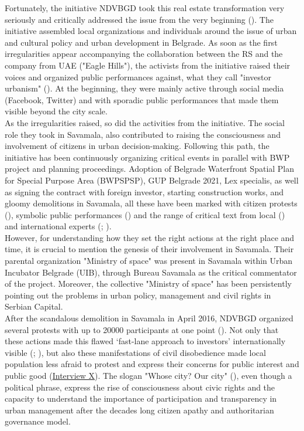 \documentclass[11pt]{report}
\begin{document}
Fortunately, the initiative NDVBGD took this real estate transformation very seriously and critically addressed the issue from the very beginning (\cite{NeDa(vi)moBeograd}).
The initiative assembled local organizations and individuals around the issue of urban and cultural policy and urban development in Belgrade.
As soon as the first irregularities appear accompanying the collaboration between the RS and the company from UAE ("Eagle Hills"), the activists from the initiative raised their voices and organized public performances against, what they call "investor urbanism" (\cite{SlobodnaEvropa2014}). At the beginning, they were mainly active through social media (Facebook, Twitter) and with sporadic public performances that made them visible beyond the city scale.
\\

As the irregularities raised, so did the activities from the initiative.
The social role they took in Savamala, also contributed to raising the consciousness and involvement of citizens in urban decision-making.
Following this path, the initiative has been continuously organizing critical events in parallel with BWP project and planning proceedings.
Adoption of Belgrade Waterfront Spatial Plan for Special Purpose Area (BWPSPSP), GUP Belgrade 2021, Lex specialis, as well as signing the contract with foreign investor, starting construction works, and gloomy demolitions in Savamala, all these have been marked with citizen protests (\cite{media}), symbolic public performances (\cite{media}) and the range of critical text from local (\cite{media}) and international experts (\cite{TheSpectacleBlog2014}; \cite{KruscheAndKlaus2015}).
\\

However, for understanding how they set the right actions at the right place and time, it is crucial to mention the genesis of their involvement in Savamala.
Their parental organization "Ministry of space" was present in Savamala within Urban Incubator Belgrade (UIB), through Bureau Savamala as the critical commentator of the project.
Moreover, the collective "Ministry of space" has been persistently pointing out the problems in urban policy, management and civil rights in Serbian Capital.
\\

After the scandalous demolition in Savamala in April 2016, NDVBGD organized several protests with up to 20000 participants at one point (\cite{BalkanInsight2016}).
Not only that these actions made this flawed ‘fast-lane approach to investors’ internationally visible (\cite{Eror2015}; \cite{Wright2015}), but also these manifestations of civil disobedience made local population less afraid to protest and express their concerns for public interest and public good
(\href{InterviewX}{Interview X}).
The slogan "Whose city? Our city" (\cite{Tulimirovic 2016}), even though a political phrase, express the rise of consciousness about civic rights and the capacity to understand the importance of participation and transparency in urban management after the decades long citizen apathy and authoritarian governance model.
\\
\end{document}
